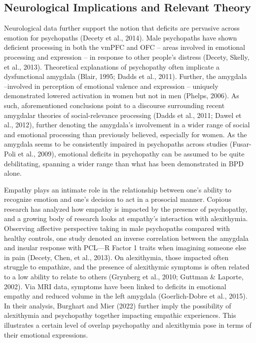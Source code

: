 \documentclass[
  man,floatsintext]{apa7}
\begin{document}
\hypertarget{neurological-implications-and-relevant-theory}{%
\subsection{Neurological Implications and Relevant Theory}\label{neurological-implications-and-relevant-theory}}

Neurological data further support the notion that deficits are pervasive across emotion for psychopaths (Decety et al., 2014). Male psychopaths have shown deficient processing in both the vmPFC and OFC -- areas involved in emotional processing and expression -- in response to other people's distress (Decety, Skelly, et al., 2013). Theoretical explanations of psychopathy often implicate a dysfunctional amygdala (Blair, 1995; Dadds et al., 2011). Further, the amygdala --involved in perception of emotional valence and expression -- uniquely demonstrated lowered activation in women but not in men (Phelps, 2006). As such, aforementioned conclusions point to a discourse surrounding recent amygdalar theories of social-relevance processing (Dadds et al., 2011; Dawel et al., 2012), further denoting the amygdala's involvement in a wider range of social and emotional processing than previously believed, especially for women. As the amygdala seems to be consistently impaired in psychopaths across studies (Fusar-Poli et al., 2009), emotional deficits in psychopathy can be assumed to be quite debilitating, spanning a wider range than what has been demonstrated in BPD alone.

Empathy plays an intimate role in the relationship between one's ability to recognize emotion and one's decision to act in a prosocial manner. Copious research has analyzed how empathy is impacted by the presence of psychopathy, and a growing body of research looks at empathy's interaction with alexithymia. Observing affective perspective taking in male psychopaths compared with healthy controls, one study denoted an inverse correlation between the amygdala and insular response with PCL---R Factor 1 traits when imagining someone else in pain (Decety, Chen, et al., 2013). On alexithymia, those impacted often struggle to empathize, and the presence of alexithymic symptoms is often related to a low ability to relate to others (Grynberg et al., 2010; Guttman \& Laporte, 2002). Via MRI data, symptoms have been linked to deficits in emotional empathy and reduced volume in the left amygdala (Goerlich-Dobre et al., 2015). In their analysis, Burghart and Mier (2022) further imply the possibility of alexithymia and psychopathy together impacting empathic experiences. This illustrates a certain level of overlap psychopathy and alexithymia pose in terms of their emotional expressions.
\end{document}
